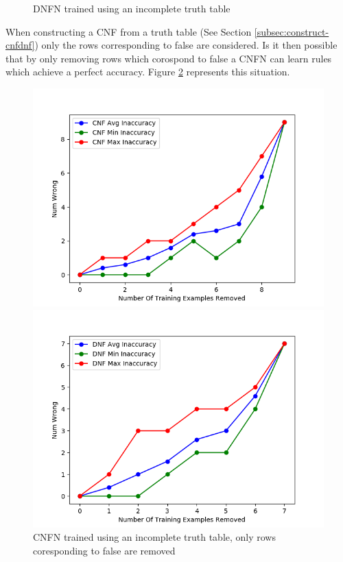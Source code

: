 \begin{figure}[H]
\begin{minipage}[b]{0.45\textwidth}
		\caption{DNFN trained using an incomplete truth table}
		\label{fig:dnf-descrete-generalizatiion}
	\end{minipage}
	\hfill
\end{figure}

When constructing a CNF from a truth table (See Section \ref{subsec:construct-cnfdnf}) only the rows corresponding to false are considered. Is it then possible that by only removing rows which corospond to false a CNFN can learn rules which achieve a perfect accuracy. Figure \ref{fig:cnf-descrete-generalizatiion-partial} represents this situation.

\begin{figure}[H]
	\centering
	\begin{minipage}[b]{0.45\textwidth}
		\includegraphics[width=\textwidth]{cnf-descrete-generalization-partial.png}
		\caption{CNFN trained using an incomplete truth table, only rows coresponding to false are removed}
		\label{fig:cnf-descrete-generalizatiion-partial}
	\end{minipage}
	\begin{minipage}[b]{0.45\textwidth}
		\includegraphics[width=\textwidth]{dnf-descrete-generalization-partial.png}

\end{minipage}
\end{figure}
